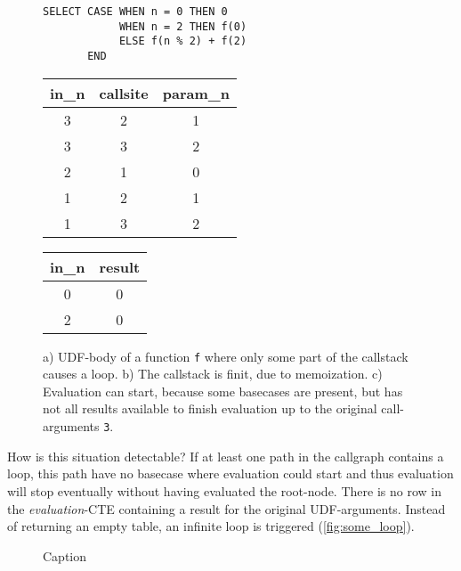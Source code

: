 \begin{figure}[h!]\small
    \begin{minipage}[b]{.45\linewidth}
    \centering
    \begin{verbatim}
SELECT CASE WHEN n = 0 THEN 0
            WHEN n = 2 THEN f(0)
            ELSE f(n % 2) + f(2)
       END
    \end{verbatim}
    \subcaption{}\label{fig:some_loop_udf}
    \end{minipage}%
    \begin{minipage}[b]{.3\linewidth}
    \centering
    \begin{tabular}{c|c|c}
in\_n & callsite & param\_n \\\hline
3 & 2 & 1 \\
3 & 3 & 2 \\
2 & 1 & 0 \\
1 & 2 & 1 \\
1 & 3 & 2
    \end{tabular}
    \subcaption{}\label{fig:some_loop_callstack}
    \end{minipage}
    \begin{minipage}[b]{.2\linewidth}
    \centering
    \begin{tabular}{c|c}
in\_n & result \\\hline
0 & 0 \\\hline
2 & 0 \\
    \end{tabular}
    \subcaption{}\label{fig:some_loop_evaluation}
    \end{minipage}
    \caption{a) UDF-body of a function \texttt{f} where only some part of the callstack causes a loop. b) The callstack is finit, due to memoization. c) Evaluation can start, because some basecases are present, but has not all results available to finish evaluation up to the original call-arguments \texttt{3}.}\label{fig:some_loop}
\end{figure}

How is this situation detectable? If at least one path in the callgraph contains a loop, this path have no basecase where evaluation could start and thus evaluation will stop eventually without having evaluated the root-node. There is no row in the \textit{evaluation}-CTE containing a result for the original UDF-arguments. Instead of returning an empty table, an infinite loop is triggered (\autoref{fig:some_loop}).


\begin{figure}[h!]
    \centering
    \caption{Caption}
    \label{fig:my_label}
\end{figure}



